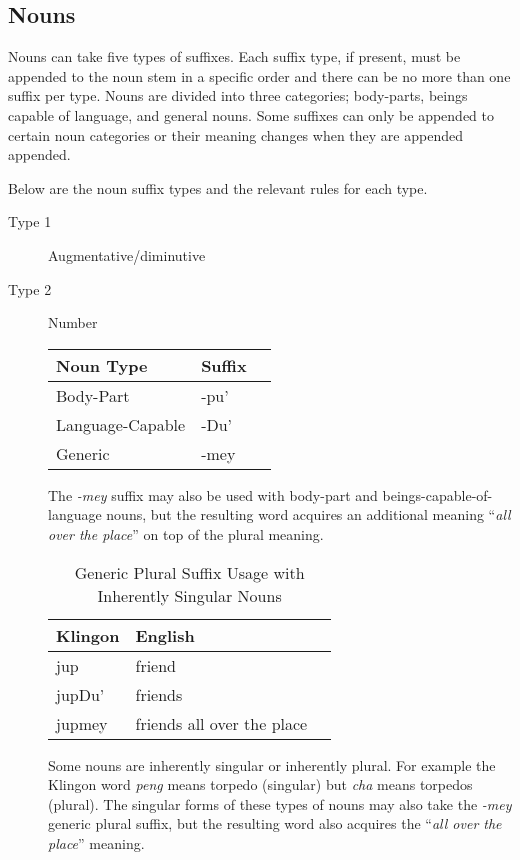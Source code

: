 \documentclass[11pt]{article}
\begin{document}
\subsection {Nouns}

Nouns can take five types of suffixes. Each suffix type, if present, must be appended to the noun stem in a specific order and there can be no more than one suffix per type. Nouns are divided into three categories; body-parts, beings capable of language, and general nouns. Some suffixes can only be appended to certain noun categories or their meaning changes when they are appended appended.

Below are the noun suffix types and the relevant rules for each type.

\begin{description}
	\item[Type 1] Augmentative/diminutive
	\item[Type 2] Number

	\begin{center}
	\begin{tabular}{lll}
	\toprule
	\bf{Noun Type} & \bf{Suffix} \\
	\midrule
	Body-Part & -pu' \\
	Language-Capable & -Du' \\
	Generic & -mey \\
	\bottomrule
	\end{tabular}
	\end{center}

	The \textit{-mey} suffix may also be used with body-part and beings-capable-of-language nouns, but the resulting word acquires an additional meaning ``\textit{all over the place}'' on top of the plural meaning.
	
	\begin{table}[h]
	\begin{center}
	\begin{tabular}{lll}
	\toprule
	\bf Klingon & \bf English \\
	\midrule
	jup & friend \\
	jupDu' & friends \\
	jupmey & friends all over the place \\
	\bottomrule
	\end{tabular}
	\end{center}
	\caption{Generic Plural Suffix Usage with Inherently Singular Nouns}
	\end{table}

	Some nouns are inherently singular or inherently plural. For example the Klingon word \textit{peng} means torpedo (singular) but \textit{cha} means torpedos (plural). The singular forms of these types of nouns may also take the \textit{-mey} generic plural suffix, but the resulting word also acquires the ``\textit{all over the place}'' meaning.
	

\end{description}
\end{document}
